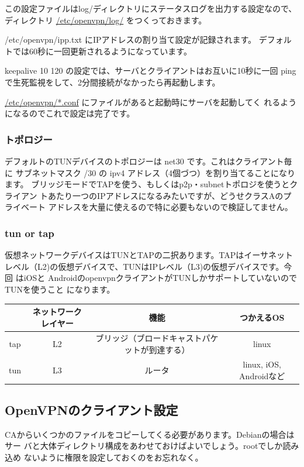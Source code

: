 \documentclass[mingoth,a4paper]{jsarticle}
\begin{document}
この設定ファイルはlog/ディレクトリにステータスログを出力する設定なので、
ディレクトリ \url{/etc/openvpn/log/} をつくっておきます。

/etc/openvpn/ipp.txt にIPアドレスの割り当て設定が記録されます。
デフォルトでは60秒に一回更新されるようになっています。

keepalive 10 120 の設定では、サーバとクライアントはお互いに10秒に一回
ping で生死監視をして、2分間接続がなかったら再起動します。

\url{ /etc/openvpn/*.conf} にファイルがあると起動時にサーバを起動してく
れるようになるのでこれで設定は完了です。

\subsubsection{トポロジー}

デフォルトのTUNデバイスのトポロジーは net30 です。これはクライアント毎に
サブネットマスク /30 の ipv4 アドレス（4個づつ）を割り当てることになります。
ブリッジモードでTAPを使う、もしくはp2p・subnetトポロジを使うとクライアン
トあたり一つのIPアドレスになるみたいですが、どうせクラスAのプライベート
アドレスを大量に使えるので特に必要もないので検証してません。

\subsubsection{tun or tap}

仮想ネットワークデバイスはTUNとTAPの二択あります。TAPはイーサネット
レベル（L2)の仮想デバイスで、TUNはIPレベル（L3)の仮想デバイスです。今回
はiOSと
AndroidのopenvpnクライアントがTUNしかサポートしていないのでTUNを使うこと
になります。

\begin{tabular}{|c|c|c|c|}
\hline
 & ネットワークレイヤー & 機能 & つかえるOS\\
\hline
tap & L2 & ブリッジ（ブロードキャストパケットが到達する） & linux \\
tun & L3 & ルータ & linux, iOS, Androidなど \\
\hline
\hline
\end{tabular}


\subsection{OpenVPNのクライアント設定}

CAからいくつかのファイルをコピーしてくる必要があります。Debianの場合はサー
バと大体ディレクトリ構成をあわせておけばよいでしょう。rootでしか読み込め
ないように権限を設定しておくのをお忘れなく。
\end{document}
